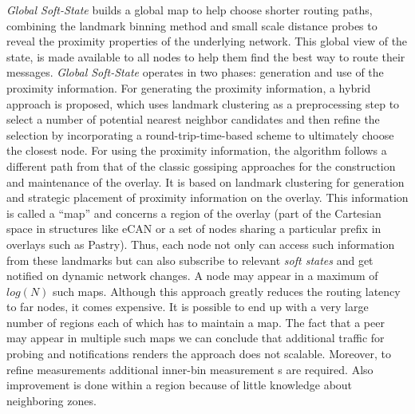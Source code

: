 
\emph{Global Soft-State} \cite{XTZ2003} builds a global map to help
choose shorter routing paths, combining the landmark binning method and small
scale distance probes to reveal the proximity properties of the underlying
network. %
This global view of the
state, is made available to all nodes to help them find the best way to
route their messages. \emph{Global Soft-State} operates in two phases:
generation and use of the proximity information. For generating the proximity
information, a hybrid approach is proposed, which uses landmark clustering as a
preprocessing step to select a number of potential nearest neighbor
candidates and then refine the selection by incorporating a
round-trip-time-based scheme to ultimately choose the closest node. For using
the proximity information, the algorithm follows a different path from that of the
classic gossiping approaches for the construction and maintenance of the
overlay. It is based on landmark clustering for generation and strategic
placement of proximity information on the overlay. This information is called a
``map'' and concerns a region of the overlay (part of the Cartesian space in
structures like eCAN\cite{xu_ecan_2002} or a set of nodes sharing a particular
prefix in overlays such as Pastry\cite{antony_pastry_2001}). Thus, each node not
only can access such information from these landmarks but can also subscribe to
relevant \emph{soft states} and get notified on dynamic network changes. A
node may appear in a maximum of $log\left( N \right)$ such
maps.
Although this approach greatly reduces the routing latency to far nodes, it
comes expensive. It is possible to end up with a very large number of regions
each of which has to maintain a map. The fact that a peer may appear in multiple
such maps we can conclude that additional traffic for probing and notifications
renders the approach does not scalable. Moreover, to refine measurements
additional inner-bin measurement s are required\cite{WZS2004}. Also improvement
is done within a region because of little knowledge about neighboring zones.

